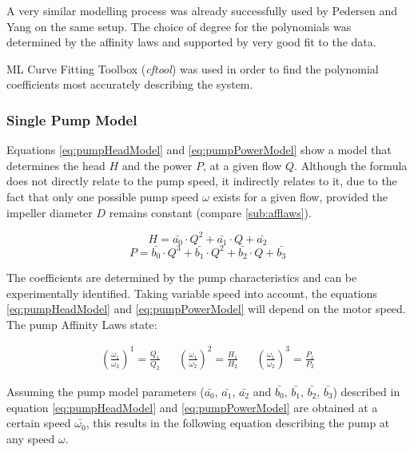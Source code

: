 A very similar modelling process was already successfully used by Pedersen and Yang 
\cite{YangMultiPump2008} on the same setup.
The choice of degree for the polynomials was determined by the affinity laws \cite{Volk2014}
and supported by very good fit to the data.

ML Curve Fitting Toolbox (\textit{cftool}) \cite{cftool}
was used in order to find the polynomial coefficients most accurately describing the system.

\subsubsection{Single Pump Model}
Equations \ref{eq:pumpHeadModel} and \ref{eq:pumpPowerModel} show a model that 
determines the head $H$ and the power $P$,
at a given flow $Q$. 
Although the formula does not directly relate to the pump speed, it indirectly relates to it,
due to the fact that only one possible pump speed $\omega$ exists for a given flow,
provided the impeller diameter $D$ remains constant (compare \ref{sub:afflaws}).

\begin{equation}
	H = \bar{a_{0}} \cdot Q^2 + \bar{a_{1}} \cdot Q + \bar{a_{2}}
	\label{eq:pumpHeadModel}
\end{equation}
\begin{equation}
	P = \bar{b_{0}} \cdot Q^3 + \bar{b_{1}} \cdot Q^2 + \bar{b_{2}} \cdot Q + \bar{b_{3}}
	\label{eq:pumpPowerModel}
\end{equation}

The coefficients are determined by the pump characteristics and can be experimentally identified.
Taking variable speed into account, the equations \ref{eq:pumpHeadModel}  and \ref{eq:pumpPowerModel}
will depend on the motor speed. The pump Affinity Laws state:

\begin{align*}
	\left(\frac{\omega_1}{\omega_2}\right)^1 = \frac{Q_1}{Q_2} && 
	\left(\frac{\omega_1}{\omega_2}\right)^2 = \frac{H_1}{H_2} &&
	\left(\frac{\omega_1}{\omega_2}\right)^3 = \frac{P_1}{P_2}	
\end{align*}

Assuming the pump model parameters ($\bar{a_{0}}$, $\bar{a_{1}}$, $\bar{a_{2}}$ and $\bar{b_{0}}$,
$\bar{b_{1}}$, $\bar{b_{2}}$, $\bar{b_{3}}$) described in equation \ref{eq:pumpHeadModel} and 
\ref{eq:pumpPowerModel} are obtained at a certain speed $\bar{\omega_{0}}$, 
this results in the following equation describing the pump at any speed $\omega$.

